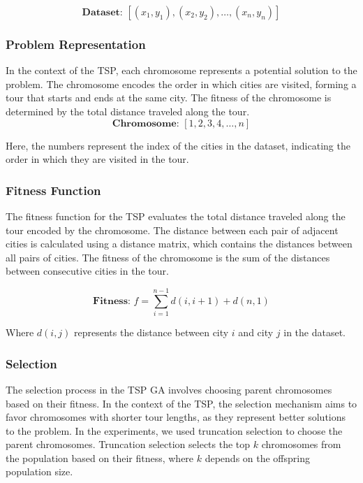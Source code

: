 \documentclass[conference]{IEEEtran}
\begin{document}
\begin{equation*}
    \textbf{Dataset: } [(x_1, y_1), (x_2, y_2), \dots, (x_n, y_n)]
\end{equation*}

\subsubsection{Problem Representation}
In the context of the TSP, each chromosome represents a potential solution to
the problem. The chromosome encodes the order in which cities are visited,
forming a tour that starts and ends at the same city. The fitness of the
chromosome is determined by the total distance traveled along the tour.
\begin{equation*}
    \textbf{Chromosome: } [1, 2, 3, 4, \dots, n]
\end{equation*}

Here, the numbers represent the index of the cities in the dataset, indicating
the order in which they are visited in the tour.

\subsubsection{Fitness Function}
The fitness function for the TSP evaluates the total distance traveled along
the tour encoded by the chromosome. The distance between each pair of adjacent
cities is calculated using a distance matrix, which contains the distances
between all pairs of cities. The fitness of the chromosome is the sum of the
distances between consecutive cities in the tour.

\begin{equation*}
    \textbf{Fitness: } f = \sum_{i=1}^{n-1} d(i, i+1) + d(n, 1)
\end{equation*}

Where $d(i, j)$ represents the distance between city $i$ and city $j$ in the
dataset.

\subsubsection{Selection}
The selection process in the TSP GA involves choosing parent chromosomes based
on their fitness. In the context of the TSP, the selection mechanism aims to
favor chromosomes with shorter tour lengths, as they represent better solutions
to the problem. In the experiments, we used truncation selection to choose the
parent chromosomes. Truncation selection selects the top $k$ chromosomes from
the population based on their fitness, where $k$ depends on the offspring
population size.
\end{document}
